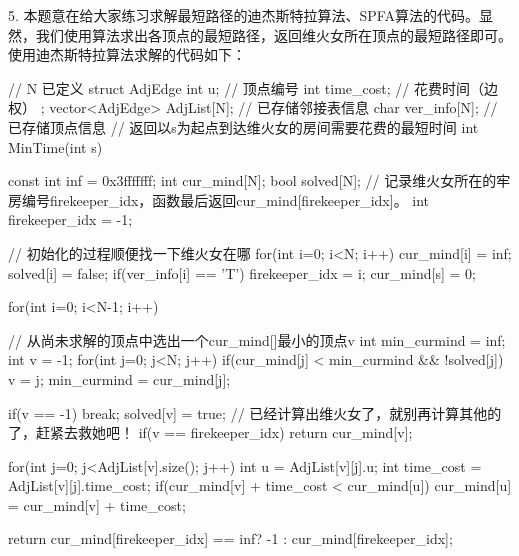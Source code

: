 \vspace{\baselineskip}

5. 本题意在给大家练习求解最短路径的迪杰斯特拉算法、SPFA算法的代码。显然，我们使用算法求出各顶点的最短路径，返回维火女所在顶点的最短路径即可。
使用迪杰斯特拉算法求解的代码如下：
\begin{cppcode}
    // N 已定义
    struct AdjEdge {
        int u;          // 顶点编号
        int time_cost;  // 花费时间（边权）
    };
    vector<AdjEdge> AdjList[N];    // 已存储邻接表信息
    char ver_info[N];   // 已存储顶点信息
    // 返回以s为起点到达维火女的房间需要花费的最短时间
    int MinTime(int s) {
        const int inf = 0x3fffffff;
        int cur_mind[N];
        bool solved[N];
        // 记录维火女所在的牢房编号firekeeper_idx，函数最后返回cur_mind[firekeeper_idx]。
        int firekeeper_idx = -1;

        // 初始化的过程顺便找一下维火女在哪
        for(int i=0; i<N; i++) {
            cur_mind[i] = inf;
            solved[i] = false;
            if(ver_info[i] == 'T') {
                firekeeper_idx = i;
            }
        }
        cur_mind[s] = 0;

        for(int i=0; i<N-1; i++) {
            // 从尚未求解的顶点中选出一个cur_mind[]最小的顶点v
            int min_curmind = inf;
            int v = -1;
            for(int j=0; j<N; j++) {
                if(cur_mind[j] < min_curmind && !solved[j]) {
                    v = j;
                    min_curmind = cur_mind[j];
                }
            }

            if(v == -1) {
                break;
            }
            solved[v] = true;
            // 已经计算出维火女了，就别再计算其他的了，赶紧去救她吧！
            if(v == firekeeper_idx) {
                return cur_mind[v];
            }

            for(int j=0; j<AdjList[v].size(); j++) {
                int u = AdjList[v][j].u;
                int time_cost = AdjList[v][j].time_cost;
                if(cur_mind[v] + time_cost < cur_mind[u]) {
                    cur_mind[u] = cur_mind[v] + time_cost;
                }
            }

        }
        return cur_mind[firekeeper_idx] == inf? -1 : cur_mind[firekeeper_idx];
    }
\end{cppcode}

